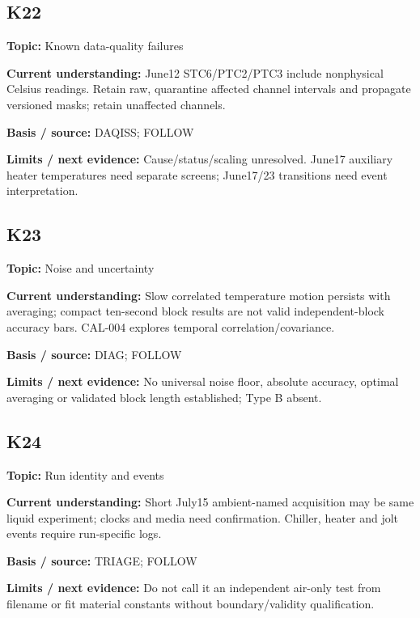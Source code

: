 \documentclass[11pt]{article}
\begin{document}
\par\noindent\begin{minipage}{\textwidth}\small\setlength{\parskip}{2pt}
\subsection*{K22}
\textbf{Topic:} Known data-quality failures\par
\textbf{Current understanding:} June12 STC6/PTC2/PTC3 include nonphysical Celsius readings. Retain raw, quarantine affected channel intervals and propagate versioned masks; retain unaffected channels.\par
\textbf{Basis / source:} DAQISS; FOLLOW\par
\textbf{Limits / next evidence:} Cause/status/scaling unresolved. June17 auxiliary heater temperatures need separate screens; June17/23 transitions need event interpretation.\par
\end{minipage}\par\vspace{5pt}
\par\noindent\begin{minipage}{\textwidth}\small\setlength{\parskip}{2pt}
\subsection*{K23}
\textbf{Topic:} Noise and uncertainty\par
\textbf{Current understanding:} Slow correlated temperature motion persists with averaging; compact ten-second block results are not valid independent-block accuracy bars. CAL-004 explores temporal correlation/covariance.\par
\textbf{Basis / source:} DIAG; FOLLOW\par
\textbf{Limits / next evidence:} No universal noise floor, absolute accuracy, optimal averaging or validated block length established; Type B absent.\par
\end{minipage}\par\vspace{5pt}
\par\noindent\begin{minipage}{\textwidth}\small\setlength{\parskip}{2pt}
\subsection*{K24}
\textbf{Topic:} Run identity and events\par
\textbf{Current understanding:} Short July15 ambient-named acquisition may be same liquid experiment; clocks and media need confirmation. Chiller, heater and jolt events require run-specific logs.\par
\textbf{Basis / source:} TRIAGE; FOLLOW\par
\textbf{Limits / next evidence:} Do not call it an independent air-only test from filename or fit material constants without boundary/validity qualification.\par
\end{minipage}\par\vspace{5pt}
\end{document}
